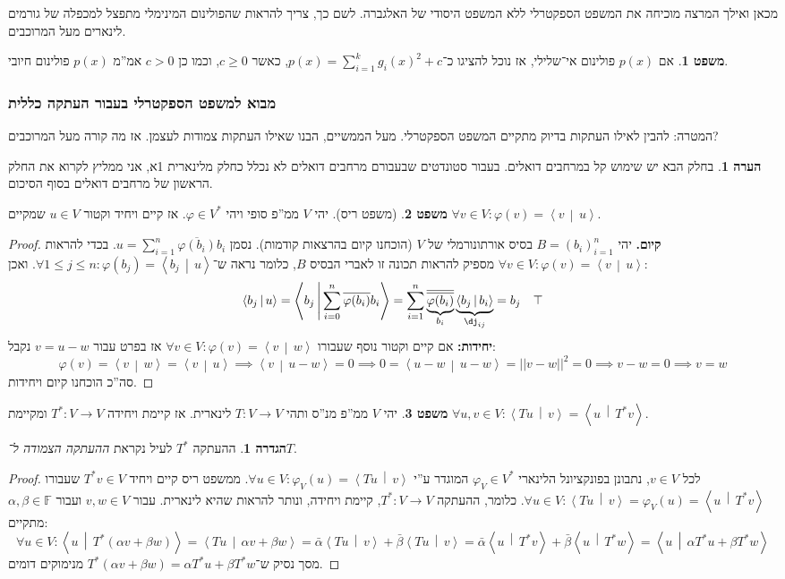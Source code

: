 \documentclass[a4paper]{article}
\newcommand\vphi  {\varphi}
\newcommand\ra    {\rangle}
\newcommand\la    {\langle}
\newcommand\ol    {\overline}
\newcommand\sumni     {\sum_{i = 0}^{n}}
\newcommand\F         {\mathbb{F}}
\newcommand\co        {\colon}
\newcommand\norm[1]   {\left \vert \left \vert #1 \right \vert \right \vert}
\newcommand\mut [2]   {\left \la #1 \,\middle\vert\, #2 \right \ra}
\newcommand\ag        {\alpha}
\newcommand\bg        {\beta}
\renewcommand\phi     {\varphi}
\theoremstyle{definition}
\newtheorem{Theorem}{משפט}
\newtheorem{definition}{הגדרה}
\newtheorem{Remark}{הערה}
\newcommand\theo  [1] {\begin{Theorem}#1\end{Theorem}}
\newcommand\defi  [1] {\begin{definition}#1\end{definition}}
\newcommand\rmark [1] {\begin{Remark}#1\end{Remark}}
\begin{document}
	מכאן ואילך המרצה מוכיחה את המשפט הספקטרלי ללא המשפט היסודי של האלגברה. לשם כך, צריך להראות שהפולינום המינימלי מתפצל למכפלה של גורמים לינארים מעל המרוכבים. 
	
	\theo{אם $p(x)$ פולינום אי־שלילי, אז נוכל להציגו כ־$p(x) = \sum_{i = 1}^{k}g_i(x)^2 + c$, כאשר $c \ge 0$, וכמו כן $c > 0$ אמ''מ $p(x)$ פולינום חיובי. }
	
	\subsubsection{מבוא למשפט הספקטרלי בעבור העתקה כללית}
	
	המטרה: להבין לאילו העתקות בדיוק מתקיים המשפט הספקטרלי. מעל הממשיים, הבנו שאילו העתקות צמודות לעצמן. אז מה קורה מעל המרוכבים? 
	
	\rmark{בחלק הבא יש שימוש קל במרחבים דואלים. בעבור סטונדטים שבעבורם מרחבים דואלים לא נכלל כחלק מלינארית 1א, אני ממליץ לקרוא את החלק הראשון של מרחבים דואלים בסוף הסיכום. }
	
	
	\theo{(משפט ריס). יהי $V$ ממ''פ סופי ויהי $\vphi \in V^*$. אז קיים ויחיד וקטור $u \in V$ שמקיים $\forall v \in V \co \vphi(v) = \mut{v}{u}$. }\begin{proof}
		\textbf{קיום. }יהי $B = (b_i)_{i = 1}^{n}$ בסיס אורתונורמלי של $V$ (הוכחנו קיום בהרצאות קודמות). נסמן $u = \sum_{i =1}^{n}\ol{\phi(b_i)} b_i$. בכדי להראות $\forall v \in V \co \phi(v) = \mut{v}{u}$ מספיק להראות תכונה זו לאברי הבסיס $B$, כלומר נראה ש־$\forall 1 \le j \le n \co \phi(b_j) = \mut{b_j}{u}$. ואכן: 
		\[ \mut{b_j}{u} = \mut{b_j}{\sumni \ol{\phi(b_i)}b_i} = \sum_{i = 1}^{n}\underbrace{\ol{\ol{\phi(b_i)}}}_{b_i}\underbrace{\mut{b_j}{b_i}}_{\dj_{ij}} = b_j \quad \top \]
		\textbf{יחידות: }אם קיים וקטור נוסף שעבורו $\forall v \in V \co \phi(v) = \mut{v}{w}$ אז בפרט עבור $v = u - w$ נקבל: 
		\[ \phi(v) = \mut{v}{w} = \mut{v}{u} \implies \mut{v}{u - w} = 0 \implies 0 = \mut{u - w}{u - w} = \norm{v - w}^{2} = 0 \implies v - w = 0 \implies v = w \]
		סה''כ הוכחנו קיום ויחידות. 
	\end{proof}
	
	\theo{יהי $V$ ממ''פ מנ''ס ותהי $T \co V \to V$ לינארית. אז קיימת ויחידה $T^* \co V \to V$ ומקיימת $\forall u ,v \in V \co \mut{Tu}{v} = \mut{u}{T^*v}$. }
	\defi{ההעתקה $T^*$ לעיל נקראת \textit{ההעתקה הצמודה ל־$T$}. }
	\begin{proof}
		לכל $v \in V$, נתבונן בפונקציונל הלינארי $\phi_V \in V^*$ המוגדר ע''י $\forall u \in V \co \phi_V(u) = \mut{Tu}{v}$. ממשפט ריס קיים ויחיד $T^*v \in V$ שעבורו $\forall u \in V \co \mut{Tu}{v} = \phi_V(u) = \mut{u}{T^*v}$. כלומר, ההעתקה $T^* \co V \to V$, קיימת ויחידה, ונותר להראות שהיא לינארית. עבור $v, w \in V$ ועבור $\ag, \bg \in \F$ מתקיים: 
		\[ \forall u \in V \co \mut{u}{T^* (\ag v + \bg w)} = \mut{Tu}{\ag v + \bg w} = \bar \ag \mut{Tu}{v} + \bar \bg \mut{Tu}{v} = \bar \ag \mut{u}{T^* v} + \bar \bg \mut{u}{T^*w} = \mut{u}{\ag T^*u + \bg T^*w} \]
		מסך נסיק ש־$T^*(\ag v + \bg w) = \ag T^* u + \bg T^* w$ מנימוקים דומים. 
	\end{proof}
	
\end{document}
